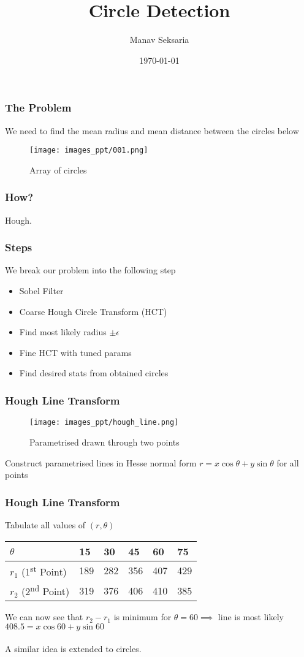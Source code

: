 \documentclass{beamer}
\title{Circle Detection}
\author{Manav Seksaria}
\institute{IIT Madras}
\date{\today}
\newcommand{\ts}{\textsuperscript}
\begin{document}
\frame{\titlepage}

\begin{frame}\frametitle{The Problem}
We need to find the mean radius and mean distance between the circles below

\begin{figure}
    \centering
    \texttt{[image: images\_ppt/001.png]}
    \caption{Array of circles}
\end{figure}
\end{frame}

\begin{frame}\frametitle{\Huge How?}
{\huge Hough.}
\end{frame}

\begin{frame}\frametitle{Steps}
We break our problem into the following step
\begin{itemize}
    \item Sobel Filter
    \item Coarse Hough Circle Transform (HCT)
    \item Find most likely radius $\pm \epsilon$
    \item Fine HCT with tuned params
    \item Find desired stats from obtained circles
\end{itemize}
\end{frame}

\begin{frame}\frametitle{Hough Line Transform}

\begin{figure}
    \centering
    \texttt{[image: images\_ppt/hough\_line.png]}
    \caption{Parametrised drawn through two points}
\end{figure}

Construct parametrised lines in Hesse normal form $r=x\cos \theta +y\sin \theta$ for all points
\end{frame}

\begin{frame}\frametitle{Hough Line Transform}

Tabulate all values of $(r, \theta)$

\begin{table}[!ht]
    \centering
    \begin{tabular}{|l|l|l|l|l|l|}
    \hline
        $\theta$ & 15 & 30 & 45 & 60 & 75 \\ \hline
        $r_1$ (1\ts{st} Point) & 189 & 282 & 356 & 407 & 429 \\ \hline
        $r_2$ (2\ts{nd} Point) & 319 & 376 & 406 & 410 & 385 \\ \hline
    \end{tabular}
\end{table}

We can now see that $r_2 - r_1$ is minimum for $\theta=60 \implies$ line is most likely $408.5=x\cos 60 +y\sin 60$
\\
\\
A similar idea is extended to circles.
\end{frame}
\end{document}
